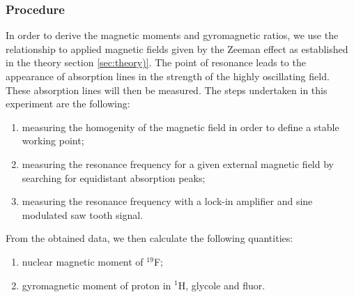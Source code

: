 \subsubsection{Procedure}
\label{ssubsec:procedure}
In order to derive the magnetic moments and gyromagnetic ratios, 
we use the relationship to applied magnetic fields given by the Zeeman effect 
as established in the theory section \ref{sec:theory)}. 
The point of resonance leads to the appearance of absorption lines 
in the strength of the highly oscillating field. These absorption lines 
will then be measured. 
The steps undertaken in this experiment are the following:
\begin{enumerate}
\item
measuring the homogenity of the magnetic field in order to define a stable working point;
\item
measuring the resonance frequency for a given external magnetic field by searching for 
equidistant absorption peaks;
\item
measuring the resonance frequency with a lock-in amplifier and sine modulated saw tooth signal.
\end{enumerate}
From the obtained data, we then calculate the following quantities:
\begin{enumerate}
\item
nuclear magnetic moment of $^19$F;
\item
gyromagnetic moment of proton in $^1$H, glycole and fluor.
\end{enumerate}

